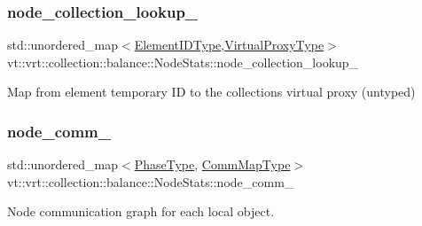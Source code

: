 \subsubsection{\texorpdfstring{node\+\_\+collection\+\_\+lookup\+\_\+}{node\_collection\_lookup\_}}
{\footnotesize\ttfamily std\+::unordered\+\_\+map$<$\hyperlink{namespacevt_1_1vrt_1_1collection_1_1balance_a14c8d2c972f2913aa3f1636e5be0a120}{Element\+I\+D\+Type},\hyperlink{namespacevt_a1b417dd5d684f045bb58a0ede70045ac}{Virtual\+Proxy\+Type}$>$ vt\+::vrt\+::collection\+::balance\+::\+Node\+Stats\+::node\+\_\+collection\+\_\+lookup\+\_\+\hspace{0.3cm}{\ttfamily [private]}}



Map from element temporary ID to the collection\textquotesingle{}s virtual proxy (untyped) 

\mbox{\label{structvt_1_1vrt_1_1collection_1_1balance_1_1_node_stats_ad07d8cd0a63ec07559711162e0da8157}} 
\subsubsection{\texorpdfstring{node\+\_\+comm\+\_\+}{node\_comm\_}}
{\footnotesize\ttfamily std\+::unordered\+\_\+map$<$\hyperlink{namespacevt_a46ce6733d5cdbd735d561b7b4029f6d7}{Phase\+Type}, \hyperlink{namespacevt_1_1vrt_1_1collection_1_1balance_a10860c956804d644db54a16012352728}{Comm\+Map\+Type}$>$ vt\+::vrt\+::collection\+::balance\+::\+Node\+Stats\+::node\+\_\+comm\+\_\+\hspace{0.3cm}{\ttfamily [private]}}



Node communication graph for each local object. 

\mbox{\label{structvt_1_1vrt_1_1collection_1_1balance_1_1_node_stats_ab6fa4f5cc9789586b7a8adc59fe8a184}} 
